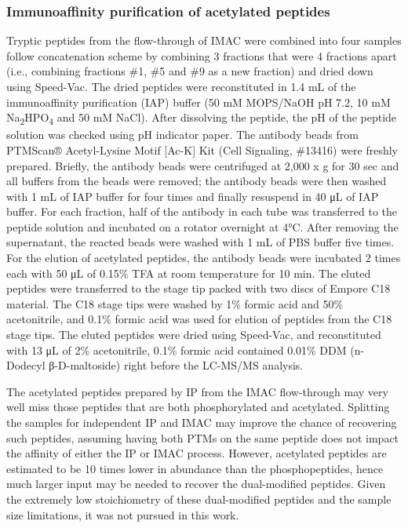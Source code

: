 \subsubsection{Immunoaffinity purification of acetylated peptides}
Tryptic peptides from the flow-through of IMAC were combined into four samples follow concatenation scheme by combining 3 fractions that were 4 fractions apart (i.e., combining fractions \#1, \#5 and \#9 as a new fraction) and dried down using Speed-Vac. The dried peptides were reconstituted in 1.4 mL of the immunoaffinity purification (IAP) buffer (50 mM MOPS/NaOH pH 7.2, 10 mM Na\textsubscript{2}HPO\textsubscript{4} and 50 mM NaCl). After dissolving the peptide, the pH of the peptide solution was checked using pH indicator paper. The antibody beads from PTMScan® Acetyl-Lysine Motif [Ac-K] Kit (Cell Signaling, \#13416) were freshly prepared. Briefly, the antibody beads were centrifuged at 2,000 x g for 30 sec and all buffers from the beads were removed; the antibody beads were then washed with 1 mL of IAP buffer for four times and finally resuspend in 40 μL of IAP buffer. For each fraction, half of the antibody in each tube was transferred to the peptide solution and incubated on a rotator overnight at 4°C. After removing the supernatant, the reacted beads were washed with 1 mL of PBS buffer five times. For the elution of acetylated peptides, the antibody beads were incubated 2 times each with 50 μL of 0.15\% TFA at room temperature for 10 min. The eluted peptides were transferred to the stage tip packed with two discs of Empore C18 material. The C18 stage tips were washed by 1\% formic acid and 50\% acetonitrile, and 0.1\% formic acid was used for elution of peptides from the C18 stage tips. The eluted peptides were dried using Speed-Vac, and reconstituted with 13 μL of 2\% acetonitrile, 0.1\% formic acid contained 0.01\% DDM (n-Dodecyl β-D-maltoside) right before the LC-MS/MS analysis.

The acetylated peptides prepared by IP from the IMAC flow-through may very well miss those peptides that are both phosphorylated and acetylated. Splitting the samples for independent IP and IMAC may improve the chance of recovering such peptides, assuming having both PTMs on the same peptide does not impact the affinity of either the IP or IMAC process. However, acetylated peptides are estimated to be 10 times lower in abundance than the phosphopeptides, hence much larger input may be needed to recover the dual-modified peptides. Given the extremely low stoichiometry of these dual-modified peptides and the sample size limitations, it was not pursued in this work.


